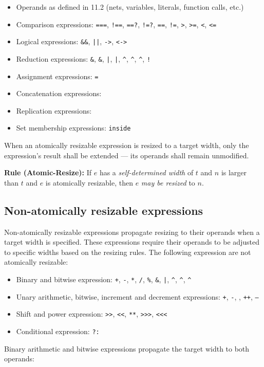 \documentclass{article}
\newcommand{\tild}{\raisebox{-.7ex}{\textasciitilde{}}}
\newcommand{\sds}{\emph{self-determined width}}
\newcommand{\mbr}{\emph{may be resized}}
\newenvironment{typingrule}[1]%
{\par\noindent\textbf{Rule (#1):} }%
{\par}
\newcommand{\binOp}{\texttt{+}, \texttt{-}, \texttt{*}, \texttt{/}, \texttt{\%},
\texttt{\&}, \texttt{|}, \texttt{\^{}}, \texttt{\^{}\tild},
\texttt{\tild\^{}}}
\newcommand{\unOp}{\texttt{+}, \texttt{-}, \texttt{\tild}, \texttt{++},
  \texttt{--}}
\newcommand{\shiftOp}{\texttt{>>}, \texttt{<}\texttt{<}, \texttt{**},
  \texttt{>>>}, \texttt{<}\texttt{<}\texttt{<}}
\newcommand{\compOp}{\texttt{===}, \texttt{!==}, \texttt{==?}, \texttt{!=?},
  \texttt{==}, \texttt{!=}, \texttt{>}, \texttt{>=}, \texttt{<}, \texttt{<=}}
\newcommand{\logicOp}{\texttt{\&\&}, \texttt{||}, \texttt{->}, \texttt{<->}}
\newcommand{\redOp}{\texttt{\&}, \texttt{\tild\&}, \texttt{|}, \texttt{\tild|},
\texttt{\^{}}, \texttt{\tild\^{}}, \texttt{\^{}\tild}, \texttt{!}}
\begin{document}
\begin{itemize}
  \item Operands as defined in 11.2 (nets, variables, literals, function
    calls, etc.)
  \item Comparison expressions: \compOp{}
  \item Logical expressions: \logicOp{}
  \item Reduction expressions: \redOp{}
  \item Assignment expressions: \texttt{=}
  \item Concatenation expressions: \texttt{\string{\dots\string}}
  \item Replication expressions: \texttt{}
  \item Set membership expressions: \texttt{inside}
\end{itemize}

When an atomically resizable expression is resized to a
target width, only the expression's result shall be extended --- its operands
shall remain unmodified.

\begin{typingrule}{Atomic-Resize}
  If $e$ has a \sds{} of $t$ and $n$ is larger than $t$
  and $e$ is atomically resizable, then $e$ \mbr{} to $n$.
\end{typingrule}

\subsection{Non-atomically resizable expressions}%

Non-atomically resizable expressions propagate resizing to their operands when
a target width is specified. These expressions require their operands to be
adjusted to specific widths based on the resizing rules. The following expression
are not atomically resizable:

\begin{itemize}
  \item Binary and bitwise expression: \binOp{}
  \item Unary arithmetic, bitwise, increment and decrement expressions:
    \unOp{}
  \item Shift and power expression: \shiftOp{}
  \item Conditional expression: \texttt{?:}
\end{itemize}

Binary arithmetic and bitwise expressions propagate the target width to both
operands:
\end{document}
